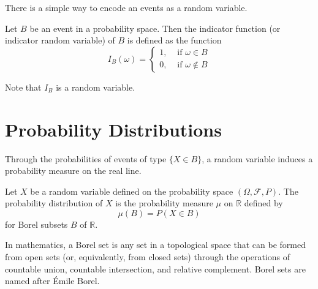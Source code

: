 \documentclass[11pt]{elegantbook}
\begin{document}
There is a simple way to encode an events as a random variable.

\begin{definition}
 Let $B$ be an event in a probability space. Then the indicator function (or indicator random variable) of $B$ is defined as the function
$$
I_B(\omega)= \begin{cases}1, & \text { if } \omega \in B \\ 0, & \text { if } \omega \notin B\end{cases}
$$
\end{definition}

\begin{note}
Note that $I_B$ is a random variable.
\end{note}
\section{Probability Distributions}

Through the probabilities of events of type $\{X \in B\}$, a random variable induces a probability measure on the real line.

\begin{definition}
Let $X$ be a random variable defined on the probability space $(\Omega, \mathcal{F}, P)$. The probability distribution of $X$ is the probability measure $\mu$ on $\mathbb{R}$ defined by
$$
\mu(B)=P(X \in B)
$$
for Borel subsets $B$ of $\mathbb{R}$.
\end{definition}

\begin{note}
    In mathematics, a Borel set is any set in a topological space that can be formed from open sets (or, equivalently, from closed sets) through the operations of countable union, countable intersection, and relative complement. Borel sets are named after Émile Borel.
\end{note}
\end{document}
